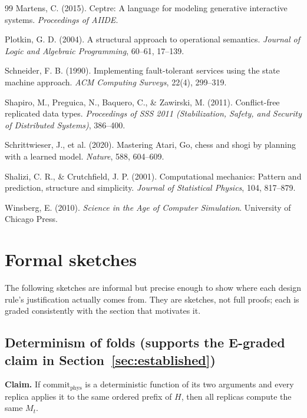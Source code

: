 \documentclass[11pt]{article}
\begin{document}
\begin{thebibliography}{99}
 Martens, C. (2015). Ceptre: A language for modeling generative interactive systems. \textit{Proceedings of AIIDE}.

 Plotkin, G. D. (2004). A structural approach to operational semantics. \textit{Journal of Logic and Algebraic Programming}, 60--61, 17--139.

 Schneider, F. B. (1990). Implementing fault-tolerant services using the state machine approach. \textit{ACM Computing Surveys}, 22(4), 299--319.

 Shapiro, M., Preguica, N., Baquero, C., \& Zawirski, M. (2011). Conflict-free replicated data types. \textit{Proceedings of SSS 2011 (Stabilization, Safety, and Security of Distributed Systems)}, 386--400.

 Schrittwieser, J., et al. (2020). Mastering Atari, Go, chess and shogi by planning with a learned model. \textit{Nature}, 588, 604--609.

 Shalizi, C. R., \& Crutchfield, J. P. (2001). Computational mechanics: Pattern and prediction, structure and simplicity. \textit{Journal of Statistical Physics}, 104, 817--879.

 Winsberg, E. (2010). \textit{Science in the Age of Computer Simulation}. University of Chicago Press.

\end{thebibliography}

\appendix

\section{Formal sketches}
\label{app:formal}

The following sketches are informal but precise enough to show where each design rule's justification actually comes from. They are sketches, not full proofs; each is graded consistently with the section that motivates it.

\subsection{Determinism of folds (supports the E-graded claim in Section~\ref{sec:established})}

\textbf{Claim.} If $\mathrm{commit}_{\mathrm{phys}}$ is a deterministic function of its two arguments and every replica applies it to the same ordered prefix of $H$, then all replicas compute the same $M_t$.
\end{document}

